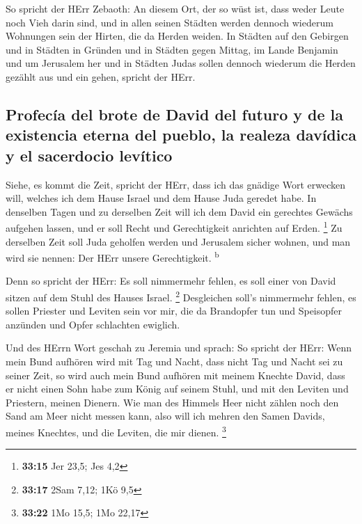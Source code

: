  So spricht der HErr Zebaoth: An diesem Ort, der so wüst
ist, dass weder Leute noch Vieh darin sind, und in allen seinen Städten
werden dennoch wiederum Wohnungen sein der Hirten, die da Herden weiden.
 In Städten auf den Gebirgen und in Städten in Gründen
und in Städten gegen Mittag, im Lande Benjamin und um Jerusalem her und
in Städten Judas sollen dennoch wiederum die Herden gezählt aus und ein
gehen, spricht der HErr.

\hypertarget{profecuxeda-del-brote-de-david-del-futuro-y-de-la-existencia-eterna-del-pueblo-la-realeza-davuxeddica-y-el-sacerdocio-levuxedtico}{%
\subsection{Profecía del brote de David del futuro y de la existencia
eterna del pueblo, la realeza davídica y el sacerdocio
levítico}\label{profecuxeda-del-brote-de-david-del-futuro-y-de-la-existencia-eterna-del-pueblo-la-realeza-davuxeddica-y-el-sacerdocio-levuxedtico}}

 Siehe, es kommt die Zeit, spricht der HErr, dass ich das
gnädige Wort erwecken will, welches ich dem Hause Israel und dem Hause
Juda geredet habe.  In denselben Tagen und zu derselben
Zeit will ich dem David ein gerechtes Gewächs aufgehen lassen, und er
soll Recht und Gerechtigkeit anrichten auf Erden. \footnote{\textbf{33:15}
  Jer 23,5; Jes 4,2}  Zu derselben Zeit soll Juda
geholfen werden und Jerusalem sicher wohnen, und man wird sie nennen:
Der HErr unsere Gerechtigkeit. \textsuperscript{b}

 Denn so spricht der HErr: Es soll nimmermehr fehlen, es
soll einer von David sitzen auf dem Stuhl des Hauses Israel. \footnote{\textbf{33:17}
  2Sam 7,12; 1Kö 9,5}  Desgleichen soll's nimmermehr
fehlen, es sollen Priester und Leviten sein vor mir, die da Brandopfer
tun und Speisopfer anzünden und Opfer schlachten ewiglich.

 Und des HErrn Wort geschah zu Jeremia und sprach:
 So spricht der HErr: Wenn mein Bund aufhören wird mit
Tag und Nacht, dass nicht Tag und Nacht sei zu seiner Zeit,
 so wird auch mein Bund aufhören mit meinem Knechte
David, dass er nicht einen Sohn habe zum König auf seinem Stuhl, und mit
den Leviten und Priestern, meinen Dienern.  Wie man des
Himmels Heer nicht zählen noch den Sand am Meer nicht messen kann, also
will ich mehren den Samen Davids, meines Knechtes, und die Leviten, die
mir dienen. \footnote{\textbf{33:22} 1Mo 15,5; 1Mo 22,17}

